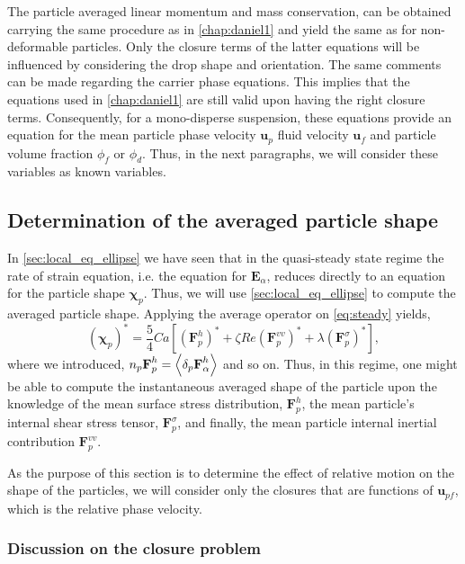 The particle averaged linear momentum and mass conservation, can be obtained carrying the same procedure as in \ref{chap:daniel1} and yield the same as for non-deformable particles. 
Only the closure terms of the latter equations will be influenced by considering the drop shape and orientation.
The same comments can be made regarding the carrier phase equations. 
This implies that the equations used in \ref{chap:daniel1} are still valid upon having the right closure terms. 
Consequently, for a mono-disperse suspension, these equations provide an equation for the mean particle phase velocity $\textbf{u}_p$ fluid velocity $\textbf{u}_f$ and particle volume fraction $\phi_f$ or $\phi_d$. 
Thus, in the next paragraphs, we will consider these variables as known variables. 

\subsection{Determination of the averaged particle shape}

In \ref{sec:local_eq_ellipse} we have seen that in the quasi-steady state regime the rate of strain equation, i.e. the equation for $\textbf{E}_\alpha$, reduces directly to an equation for the particle shape $\bm\chi_p$. 
Thus, we will use \ref{sec:local_eq_ellipse} to compute the averaged particle shape. 
Applying the average operator on \ref{eq:steady} yields,
\begin{equation}
    (\bm\chi_{p})^*
    = 
    \frac{5}{4}Ca \left[
        (\textbf{F}_p^h )^*
        + \zeta Re (\textbf{F}_p^{vv})^*
        +    \lambda (\textbf{F}_p^{\sigma})^*
    \right],
    \label{eq:steady_state_avg}
\end{equation}
where we introduced, $n_p \textbf{F}_p^h = \left<\delta_p \textbf{F}_\alpha^h\right>$ and so on. 
Thus, in this regime, one might be able to compute the instantaneous averaged shape of the particle upon the knowledge of the mean surface stress distribution, $\textbf{F}_p^h$, the mean particle's internal shear stress tensor, $\textbf{F}_p^{\sigma}$, and finally, the mean particle internal inertial contribution $\textbf{F}_p^{vv}$. 

As the purpose of this section is to determine the effect of relative motion on the shape of the particles, we will consider only the closures that are functions of $\textbf{u}_{pf}$, which is the relative phase velocity. 

\subsubsection{Discussion on the closure problem}   

